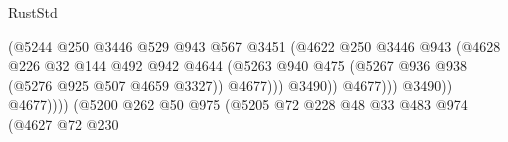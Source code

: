 \begin{lexlean}{RustStd}
\begin{coremodule}
                                                        (@5244
                                                          @250
                                                          @3446
                                                          @529
                                                          @943
                                                          @567
                                                          @3451
                                                          (@4622
                                                            @250
                                                            @3446
                                                            @943
                                                            (@4628
                                                              @226
                                                              @32
                                                              @144
                                                              @492
                                                              @942
                                                              @4644
                                                              (@5263
                                                                @940
                                                                @475
                                                                (@5267
                                                                  @936
                                                                  @938
                                                                  (@5276 @925 @507 @4659 @3327))
                                                                @4677)))
                                                          @3490))
                                                      @4677)))
                                                @3490))
                                            @4677))))
                                    (@5200
                                      @262
                                      @50
                                      @975
                                      (@5205
                                        @72
                                        @228
                                        @48
                                        @33
                                        @483
                                        @974
                                        (@4627
                                          @72
                                          @230

\end{coremodule}
\end{lexlean}
